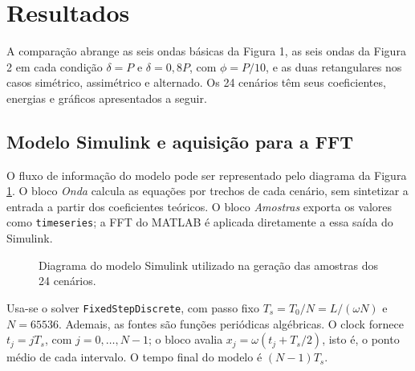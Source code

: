 \FloatBarrier
\section{Resultados}

A comparação abrange as seis ondas básicas da Figura 1,
as seis ondas da Figura 2 em cada condição $\delta=P$ e
$\delta=0{,}8P$, com $\phi=P/10$, e as duas retangulares
nos casos simétrico, assimétrico e alternado. Os 24 cenários
têm seus coeficientes, energias e gráficos apresentados a seguir.

\subsection{Modelo Simulink e aquisição para a FFT}

O fluxo de informação do modelo pode ser representado pelo diagrama da
Figura \ref{fig:modelo_simulink}. O bloco \textit{Onda} calcula as
equações por trechos de cada cenário, sem sintetizar a entrada a
partir dos coeficientes teóricos. O bloco \textit{Amostras} exporta
os valores como \texttt{timeseries}; a FFT do MATLAB é aplicada
diretamente a essa saída do Simulink.

\begin{figure}[H]
    \centering
    \caption{Diagrama do modelo Simulink utilizado na geração
    das amostras dos 24 cenários.}
    \label{fig:modelo_simulink}
\end{figure}

Usa-se o solver \texttt{FixedStepDiscrete}, com passo fixo
$T_s=T_0/N=L/(\omega N)$ e $N=65536$. Ademais, as fontes são funções periódicas
algébricas. O clock fornece $t_j=jT_s$, com $j=0,\ldots,N-1$;
o bloco avalia $x_j=\omega(t_j+T_s/2)$, isto é, o ponto médio
de cada intervalo. O tempo final do modelo é $(N-1)T_s$.

